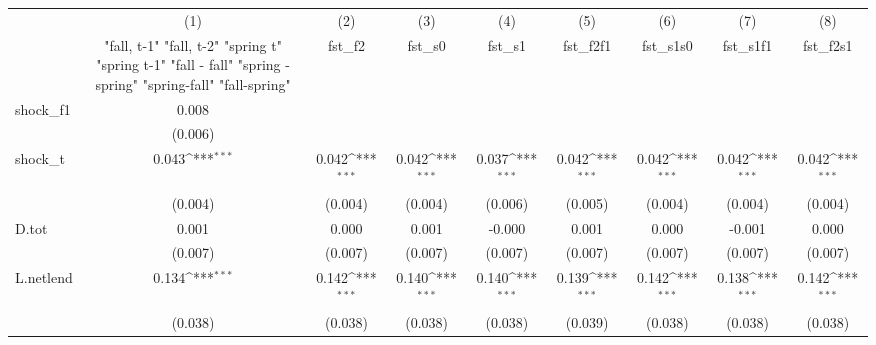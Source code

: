 {
\def\sym#1{\ifmmode^{#1}\else\(^{#1}\)\fi}
\begin{tabular}{l*{8}{c}}
\toprule
            &\multicolumn{1}{c}{(1)}&\multicolumn{1}{c}{(2)}&\multicolumn{1}{c}{(3)}&\multicolumn{1}{c}{(4)}&\multicolumn{1}{c}{(5)}&\multicolumn{1}{c}{(6)}&\multicolumn{1}{c}{(7)}&\multicolumn{1}{c}{(8)}\\
            &\multicolumn{1}{c}{  "fall, t-1" "fall, t-2" "spring t" "spring t-1"  "fall - fall" "spring - spring" "spring-fall" "fall-spring" }&\multicolumn{1}{c}{fst\_f2}&\multicolumn{1}{c}{fst\_s0}&\multicolumn{1}{c}{fst\_s1}&\multicolumn{1}{c}{fst\_f2f1}&\multicolumn{1}{c}{fst\_s1s0}&\multicolumn{1}{c}{fst\_s1f1}&\multicolumn{1}{c}{fst\_f2s1}\\
\midrule
shock\_f1    &       0.008         &                     &                     &                     &                     &                     &                     &                     \\
            &     (0.006)         &                     &                     &                     &                     &                     &                     &                     \\
\addlinespace
shock\_t     &       0.043\sym{***}&       0.042\sym{***}&       0.042\sym{***}&       0.037\sym{***}&       0.042\sym{***}&       0.042\sym{***}&       0.042\sym{***}&       0.042\sym{***}\\
            &     (0.004)         &     (0.004)         &     (0.004)         &     (0.006)         &     (0.005)         &     (0.004)         &     (0.004)         &     (0.004)         \\
\addlinespace
D.tot       &       0.001         &       0.000         &       0.001         &      -0.000         &       0.001         &       0.000         &      -0.001         &       0.000         \\
            &     (0.007)         &     (0.007)         &     (0.007)         &     (0.007)         &     (0.007)         &     (0.007)         &     (0.007)         &     (0.007)         \\
\addlinespace
L.netlend   &       0.134\sym{***}&       0.142\sym{***}&       0.140\sym{***}&       0.140\sym{***}&       0.139\sym{***}&       0.142\sym{***}&       0.138\sym{***}&       0.142\sym{***}\\
            &     (0.038)         &     (0.038)         &     (0.038)         &     (0.038)         &     (0.039)         &     (0.038)         &     (0.038)         &     (0.038)         \\

\end{tabular}}
